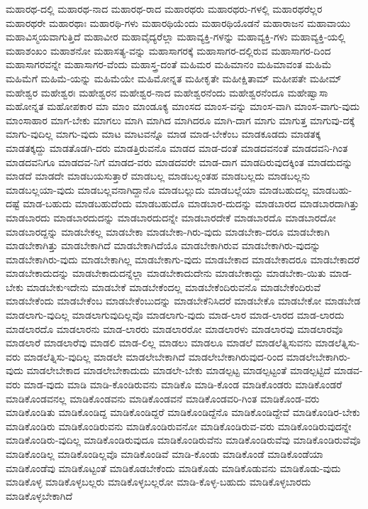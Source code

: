 {ಮಹಾರಥ-ದಲ್ಲಿ
ಮಹಾರಥ-ನಾದ
ಮಹಾರಥ-ರಾದ
ಮಹಾರಥರು
ಮಹಾರಥರು-ಗಳಲ್ಲಿ
ಮಹಾರಥರೆಲ್ಲರ
ಮಹಾರಥರೇ
ಮಹಾರಥಾಃ
ಮಹಾರಥಿ-ಗಳು
ಮಹಾರಥಿಯೆಂದು
ಮಹಾರಥಿಯೊಡನೆ
ಮಹಾರಾಜನ
ಮಹಾವಾಯು
ಮಹಾವಿಸ್ಮಯವಾಗುತ್ತಿದೆ
ಮಹಾವೀರ
ಮಹಾವೈದ್ಯರೆಲ್ಲಾ
ಮಹಾವ್ಯಕ್ತಿ-ಗಳನ್ನು
ಮಹಾವ್ಯಕ್ತಿ-ಗಳು
ಮಹಾವ್ಯಕ್ತಿ-ಯಲ್ಲಿ
ಮಹಾಶಂಖಂ
ಮಹಾಶನೋ
ಮಹಾಸತ್ಯ-ವನ್ನು
ಮಹಾಸಾಗರಕ್ಕೆ
ಮಹಾಸಾಗರ-ದಲ್ಲಿರುವ
ಮಹಾಸಾಗರ-ದಿಂದ
ಮಹಾಸಾಗರವನ್ನೇ
ಮಹಾಸಾಗರ-ವೆಂದು
ಮಹಾಸ್ತ್ರ-ದಂತೆ
ಮಹಿಮರ
ಮಹಿಮಾನಂ
ಮಹಿಮಾವಂತ
ಮಹಿಮೆ
ಮಹಿಮೆಗೆ
ಮಹಿಮೆ-ಯನ್ನು
ಮಹಿಮೆಯೇ
ಮಹಿಮೋನ್ನತ
ಮಹೀಕೃತೇ
ಮಹೀಕ್ಷಿತಾಮ್
ಮಹೀಪತೇ
ಮಹೀಮ್
ಮಹೇಶ್ವರ
ಮಹೇಶ್ವರಃ
ಮಹೇಶ್ವರನ
ಮಹೇಶ್ವರ-ನಾದ
ಮಹೇಶ್ವರನೆಂದು
ಮಹೇಶ್ವರನೆಂದೂ
ಮಹೇಷ್ವಾಸಾ
ಮಹೋನ್ನತ
ಮಹೋಪಕಾರ
ಮಾ
ಮಾಂ
ಮಾಂಡೂಕ್ಯ
ಮಾಂಸದ
ಮಾಂಸ-ವನ್ನು
ಮಾಂಸ-ವಾಗಿ
ಮಾಂಸ-ವಾಗು-ವುದು
ಮಾಂಸಾಹಾರ
ಮಾಗ-ಬೇಕು
ಮಾಗಲು
ಮಾಗಿ
ಮಾಗಿದ
ಮಾಗಿದರೂ
ಮಾಗಿ-ದಾಗ
ಮಾಗು
ಮಾಗುತ್ತ
ಮಾಗುವು-ದಕ್ಕೆ
ಮಾಗು-ವುದಿಲ್ಲ
ಮಾಗು-ವುದು
ಮಾಟ
ಮಾಟವನ್ನೊ
ಮಾಡ
ಮಾಡ-ಬೇಕೆಂಬ
ಮಾಡಕೂಡದು
ಮಾಡತಕ್ಕ
ಮಾಡತಕ್ಕದ್ದು
ಮಾಡತೊಡಗಿ-ದರು
ಮಾಡತ್ತಿರುವನೊ
ಮಾಡದ
ಮಾಡ-ದಂತೆ
ಮಾಡದವನಂತೆ
ಮಾಡದವನಿ-ಗಿಂತ
ಮಾಡದವನಿಗೂ
ಮಾಡದವ-ನಿಗೆ
ಮಾಡದ-ವರು
ಮಾಡದವರೇ
ಮಾಡ-ದಾಗ
ಮಾಡದಿರುವುದಕ್ಕಿಂತ
ಮಾಡದುದನ್ನು
ಮಾಡದೆ
ಮಾಡದೇ
ಮಾಡಬಯಸುತ್ತಾರೆ
ಮಾಡಬಲ್ಲ
ಮಾಡಬಲ್ಲಂತಹ
ಮಾಡಬಲ್ಲದು
ಮಾಡಬಲ್ಲನು
ಮಾಡಬಲ್ಲಯಾ-ವುದು
ಮಾಡಬಲ್ಲವನಾಗಿದ್ದಾನೊ
ಮಾಡಬಲ್ಲುದು
ಮಾಡಬಲ್ಲೆಯಾ
ಮಾಡಬಹುದಲ್ಲ
ಮಾಡಬಹು-ದಷ್ಟೆ
ಮಾಡ-ಬಹುದು
ಮಾಡಬಹುದೆಂದು
ಮಾಡಬಹುದೊ
ಮಾಡಬಾರ-ದುದನ್ನು
ಮಾಡಬಾರದ
ಮಾಡಬಾರದಾಗಿತ್ತು
ಮಾಡಬಾರದು
ಮಾಡಬಾರದುದನ್ನು
ಮಾಡಬಾರದುದನ್ನೇ
ಮಾಡಬಾರದೇಕೆ
ಮಾಡಬಾರದೊ
ಮಾಡಬಾರದೋ
ಮಾಡಬಾರದ್ದನ್ನು
ಮಾಡಬೇಕಲ್ಲ
ಮಾಡಬೇಕಾ
ಮಾಡಬೇಕಾ-ಗಿರು-ವುದು
ಮಾಡಬೇಕಾ-ದರೂ
ಮಾಡಬೇಕಾಗಿ
ಮಾಡಬೇಕಾಗಿತ್ತು
ಮಾಡಬೇಕಾಗಿದೆ
ಮಾಡಬೇಕಾಗಿದೆಯೊ
ಮಾಡಬೇಕಾಗಿರುವ
ಮಾಡಬೇಕಾಗಿರು-ವುದನ್ನು
ಮಾಡಬೇಕಾಗಿರು-ವುದು
ಮಾಡಬೇಕಾಗಿಲ್ಲ
ಮಾಡಬೇಕಾಗು-ವುದು
ಮಾಡಬೇಕಾದ
ಮಾಡಬೇಕಾದರೂ
ಮಾಡಬೇಕಾದರೆ
ಮಾಡಬೇಕಾದುದನ್ನು
ಮಾಡಬೇಕಾದುದನ್ನೆಲ್ಲಾ
ಮಾಡಬೇಕಾದುದೇನು
ಮಾಡಬೇಕಾದ್ದು
ಮಾಡಬೇಕಾ-ಯಿತು
ಮಾಡ-ಬೇಕು
ಮಾಡಬೇಕುಇದೇನು
ಮಾಡಬೇಕೆ
ಮಾಡಬೇಕೆಂದಲ್ಲ
ಮಾಡಬೇಕೆಂದಿರುವನೊ
ಮಾಡಬೇಕೆಂದಿರುವೆ
ಮಾಡಬೇಕೆಂದು
ಮಾಡಬೇಕೆಂಬ
ಮಾಡಬೇಕೆಂಬುದನ್ನು
ಮಾಡಬೇಕೆನಿಸಿದರೆ
ಮಾಡಬೇಕೊ
ಮಾಡಬೇಕೋ
ಮಾಡಬೇಡ
ಮಾಡಲಾಗು-ವುದಿಲ್ಲ
ಮಾಡಲಾಗುವುದಿಲ್ಲವೊ
ಮಾಡಲಾಗು-ವುದು
ಮಾಡ-ಲಾರ
ಮಾಡ-ಲಾರದ
ಮಾಡ-ಲಾರದು
ಮಾಡಲಾರದೊ
ಮಾಡಲಾರನು
ಮಾಡ-ಲಾರರು
ಮಾಡಲಾರರೋ
ಮಾಡಲಾರಳು
ಮಾಡಲಾರವು
ಮಾಡಲಾರವೊ
ಮಾಡಲಾರೆ
ಮಾಡಲಾರೆವು
ಮಾಡಲಿ
ಮಾಡ-ಲಿಲ್ಲ
ಮಾಡಲು
ಮಾಡಲೂ
ಮಾಡಲೆ
ಮಾಡಲೆತ್ನಿಸುವನು
ಮಾಡಲೆತ್ನಿಸು-ವರು
ಮಾಡಲೆತ್ನಿಸು-ವುದಿಲ್ಲ
ಮಾಡಲೇ
ಮಾಡಲೇಬೇಕಾಗಿದೆ
ಮಾಡಲೇಬೇಕಾಗಿರುವುದ-ರಿಂದ
ಮಾಡಲೇಬೇಕಾಗಿರು-ವುದು
ಮಾಡಲೇಬೇಕಾದ
ಮಾಡಲೇಬೇಕಾದುದು
ಮಾಡಲೇ-ಬೇಕು
ಮಾಡಲ್ಪಟ್ಟ
ಮಾಡಲ್ಪಟ್ಟಂತೆ
ಮಾಡಲ್ಪಟ್ಟಿದೆ
ಮಾಡವ-ವರು
ಮಾಡ-ವುದು
ಮಾಡಿ
ಮಾಡಿ-ಕೊಂಡಿರುವನು
ಮಾಡಿಕೊ
ಮಾಡಿ-ಕೊಂಡ
ಮಾಡಿಕೊಂಡರು
ಮಾಡಿಕೊಂಡರೆ
ಮಾಡಿಕೊಂಡವನಲ್ಲ
ಮಾಡಿಕೊಂಡವನು
ಮಾಡಿಕೊಂಡವನೆ
ಮಾಡಿಕೊಂಡವರಿ-ಗಿಂತ
ಮಾಡಿಕೊಂಡ-ವರು
ಮಾಡಿಕೊಂಡಿತು
ಮಾಡಿಕೊಂಡಿದ್ದ
ಮಾಡಿಕೊಂಡಿದ್ದರೆ
ಮಾಡಿಕೊಂಡಿದ್ದೆನೊ
ಮಾಡಿಕೊಂಡಿದ್ದೇವೆ
ಮಾಡಿಕೊಂಡಿರ-ಬೇಕು
ಮಾಡಿಕೊಂಡಿರು
ಮಾಡಿಕೊಂಡಿರುವನು
ಮಾಡಿಕೊಂಡಿರುವನೋ
ಮಾಡಿಕೊಂಡಿರುವ-ವರು
ಮಾಡಿಕೊಂಡಿರುವುದನ್ನೇ
ಮಾಡಿಕೊಂಡಿರು-ವುದಿಲ್ಲ
ಮಾಡಿಕೊಂಡಿರುವುದೂ
ಮಾಡಿಕೊಂಡಿರುವೆನು
ಮಾಡಿಕೊಂಡಿರುವೆವು
ಮಾಡಿಕೊಂಡಿರುವೆವೊ
ಮಾಡಿಕೊಂಡಿಲ್ಲ
ಮಾಡಿಕೊಂಡಿಲ್ಲವೊ
ಮಾಡಿಕೊಂಡಿವೆ
ಮಾಡಿ-ಕೊಂಡು
ಮಾಡಿಕೊಂಡೆ
ಮಾಡಿಕೊಂಡೆಯಾ
ಮಾಡಿಕೊಂಡೆವು
ಮಾಡಿಕೊಟ್ಟಂತೆ
ಮಾಡಿಕೊಡಬೇಕೆಂದು
ಮಾಡಿಕೊಡು
ಮಾಡಿಕೊಡುವನು
ಮಾಡಿಕೊಡು-ವುದು
ಮಾಡಿಕೊಳ್ಳ
ಮಾಡಿಕೊಳ್ಳಬಲ್ಲರು
ಮಾಡಿಕೊಳ್ಳಬಲ್ಲರೋ
ಮಾಡಿ-ಕೊಳ್ಳ-ಬಹುದು
ಮಾಡಿಕೊಳ್ಳಬಾರದು
ಮಾಡಿಕೊಳ್ಳಬೇಕಾಗಿದೆ
}
